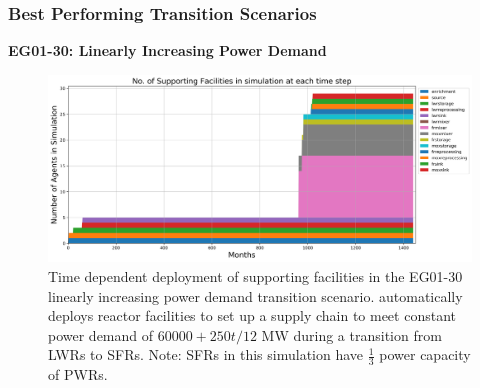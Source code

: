 \begin{frame}
    \frametitle{Best Performing Transition Scenarios}
    \textbf{EG01-30: Linearly Increasing Power Demand}
    \begin{figure}[htbp!]
        \begin{center}
          \includegraphics[width=\textwidth]{../paper/figures/eg30-stack_support.png}
        \end{center}
              \caption{Time dependent deployment of supporting facilities in 
              the EG01-30 linearly increasing power demand transition scenario. 
              \deploy automatically deploys reactor facilities 
              to set up a supply chain to meet constant power demand of $60000+250t/12$ MW
              during a transition from \glspl{LWR} to \glspl{SFR}. Note: \glspl{SFR}
              in this simulation have $\frac{1}{3}$ power capacity of \glspl{PWR}.}
      \end{figure}
\end{frame}

